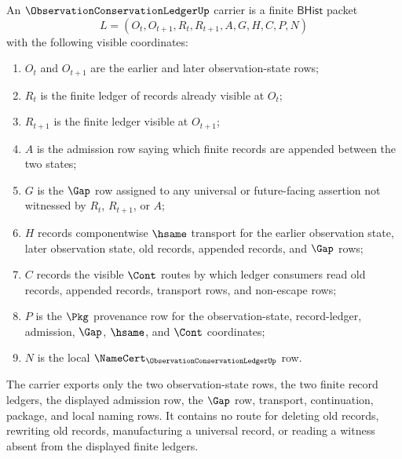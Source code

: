 \begin{definition}
\label{def:observation-conservation-ledger-carrier}
An $\ObservationConservationLedgerUp$ carrier is a finite $\mathsf{BHist}$ packet
$$
L=(O_t,O_{t+1},R_t,R_{t+1},A,G,H,C,P,N)
$$
with the following visible coordinates:
\begin{enumerate}
\item $O_t$ and $O_{t+1}$ are the earlier and later observation-state rows;
\item $R_t$ is the finite ledger of records already visible at $O_t$;
\item $R_{t+1}$ is the finite ledger visible at $O_{t+1}$;
\item $A$ is the admission row saying which finite records are appended between the two states;
\item $G$ is the $\Gap$ row assigned to any universal or future-facing assertion not witnessed by $R_t$, $R_{t+1}$, or $A$;
\item $H$ records componentwise $\hsame$ transport for the earlier observation state, later observation state, old records, appended records, and $\Gap$ rows;
\item $C$ records the visible $\Cont$ routes by which ledger consumers read old records, appended records, transport rows, and non-escape rows;
\item $P$ is the $\Pkg$ provenance row for the observation-state, record-ledger, admission, $\Gap$, $\hsame$, and $\Cont$ coordinates;
\item $N$ is the local $\NameCert_{\ObservationConservationLedgerUp}$ row.
\end{enumerate}
The carrier exports only the two observation-state rows, the two finite record ledgers, the displayed admission row, the $\Gap$ row, transport, continuation, package, and local naming rows. It contains no route for deleting old records, rewriting old records, manufacturing a universal record, or reading a witness absent from the displayed finite ledgers.
\end{definition}

